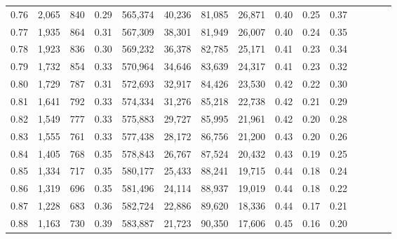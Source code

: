 \begin{tabular}{rrrcrrrrrrrrrrr}
0.76 &   2,065 &     840 &                                       0.29 &  565,374 &   40,236 &   81,085 &   26,871 &  0.40 &  0.25 &                         0.37 \\
0.77 &   1,935 &     864 &                                       0.31 &  567,309 &   38,301 &   81,949 &   26,007 &  0.40 &  0.24 &                         0.35 \\
0.78 &   1,923 &     836 &                                       0.30 &  569,232 &   36,378 &   82,785 &   25,171 &  0.41 &  0.23 &                         0.34 \\
0.79 &   1,732 &     854 &                                       0.33 &  570,964 &   34,646 &   83,639 &   24,317 &  0.41 &  0.23 &                         0.32 \\
0.80 &   1,729 &     787 &                                       0.31 &  572,693 &   32,917 &   84,426 &   23,530 &  0.42 &  0.22 &                         0.30 \\
0.81 &   1,641 &     792 &                                       0.33 &  574,334 &   31,276 &   85,218 &   22,738 &  0.42 &  0.21 &                         0.29 \\
0.82 &   1,549 &     777 &                                       0.33 &  575,883 &   29,727 &   85,995 &   21,961 &  0.42 &  0.20 &                         0.28 \\
0.83 &   1,555 &     761 &                                       0.33 &  577,438 &   28,172 &   86,756 &   21,200 &  0.43 &  0.20 &                         0.26 \\
0.84 &   1,405 &     768 &                                       0.35 &  578,843 &   26,767 &   87,524 &   20,432 &  0.43 &  0.19 &                         0.25 \\
0.85 &   1,334 &     717 &                                       0.35 &  580,177 &   25,433 &   88,241 &   19,715 &  0.44 &  0.18 &                         0.24 \\
0.86 &   1,319 &     696 &                                       0.35 &  581,496 &   24,114 &   88,937 &   19,019 &  0.44 &  0.18 &                         0.22 \\
0.87 &   1,228 &     683 &                                       0.36 &  582,724 &   22,886 &   89,620 &   18,336 &  0.44 &  0.17 &                         0.21 \\
0.88 &   1,163 &     730 &                                       0.39 &  583,887 &   21,723 &   90,350 &   17,606 &  0.45 &  0.16 &                         0.20 \\

\end{tabular}
